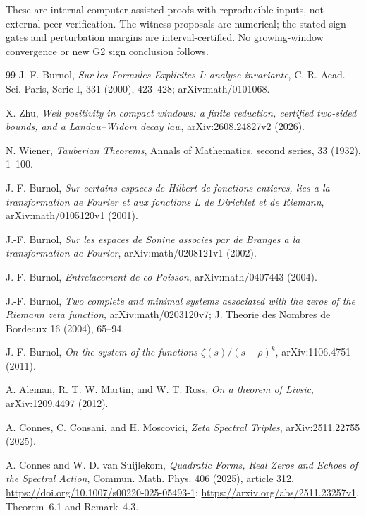\documentclass[11pt]{article}
\theoremstyle{remark}
\begin{document}
These are internal computer-assisted proofs with reproducible inputs,
not external peer verification. The witness proposals are numerical;
the stated sign gates and perturbation margins are interval-certified.
No growing-window convergence or new G2 sign conclusion follows.


\begin{thebibliography}{99}
\small
\setlength{\itemsep}{2pt}
J.-F. Burnol,
\emph{Sur les Formules Explicites I: analyse invariante},
C. R. Acad. Sci. Paris, Serie I, 331 (2000), 423--428;
arXiv:math/0101068.

X. Zhu,
\emph{Weil positivity in compact windows: a finite reduction,
certified two-sided bounds, and a Landau--Widom decay law},
arXiv:2608.24827v2 (2026).

N. Wiener,
\emph{Tauberian Theorems},
Annals of Mathematics, second series, 33 (1932), 1--100.

J.-F. Burnol,
\emph{Sur certains espaces de Hilbert de fonctions entieres, lies a la transformation de Fourier et aux fonctions L de Dirichlet et de Riemann},
arXiv:math/0105120v1 (2001).

J.-F. Burnol,
\emph{Sur les espaces de Sonine associes par de Branges a la transformation de Fourier},
arXiv:math/0208121v1 (2002).

J.-F. Burnol,
\emph{Entrelacement de co-Poisson},
arXiv:math/0407443 (2004).

J.-F. Burnol,
\emph{Two complete and minimal systems associated with the zeros of the Riemann zeta function},
arXiv:math/0203120v7; J. Theorie des Nombres de Bordeaux 16 (2004), 65--94.

J.-F. Burnol,
\emph{On the system of the functions $\zeta(s)/(s-\rho)^k$},
arXiv:1106.4751 (2011).

A. Aleman, R. T. W. Martin, and W. T. Ross,
\emph{On a theorem of Livsic},
arXiv:1209.4497 (2012).

A. Connes, C. Consani, and H. Moscovici,
\emph{Zeta Spectral Triples},
arXiv:2511.22755 (2025).

A. Connes and W. D. van Suijlekom,
\emph{Quadratic Forms, Real Zeros and Echoes of the Spectral Action},
Commun. Math. Phys. 406 (2025), article 312.
\url{https://doi.org/10.1007/s00220-025-05493-1};
\url{https://arxiv.org/abs/2511.23257v1}.
Theorem~6.1 and Remark~4.3.


\end{thebibliography}
\end{document}
